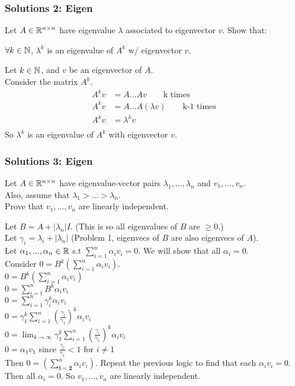 \documentclass[table]{beamer}
\newcommand\fontten{\fontsize{10}{1.2}\selectfont}
\renewenvironment{enumerate}%
{\begin{list}{\arabic{enumi}.}%
      {\setlength{\leftmargin}{2.5em}%
       \setlength{\itemsep}{-\parsep}%
       \setlength{\topsep}{-\parskip}%
       \usecounter{enumi}}%
 }{\end{list}}
\begin{document}
\begin{frame}
\frametitle{Solutions 2: Eigen}
Let $A \in \mathbb{R}^{n\times n}$ have eigenvalue $\lambda$ associated to eigenvector $v$.
Show that:
\begin{enumerate}
\item[2.] $\forall k \in \mathbb{N}$, $\lambda^k$ is an eigenvalue of $A^k$ w/ eigenvector $v$.
\begin{solution}
Let $k \in \mathbb{N}$, and $v$ be an eigenvector of $A$.\\
Consider the matrix $A^k$.\\
\begin{align*}
A^k v &= A... Av \qquad \text{k times} \\
A^k v &= A... A(\lambda v) \qquad \text{k-1 times} \\
A^k v &= \lambda^k v \\
\end{align*}
So $\lambda^k$ is an eigenvalue of $A^k$ with eigenvector $v$.
\end{solution}
\end{enumerate}
\end{frame}

\begin{frame}
\frametitle{Solutions 3: Eigen}

\begin{enumerate}

\item[3.] Let $A\in \mathbb{R}^{n \times n}$ have eigenvalue-vector pairs $\lambda_1,...,\lambda_n$ and $v_1,...,v_n$. \\
Also, assume that $\lambda_1>...>\lambda_n$.\\
Prove that $v_1,...,v_n$ are linearly independent.
\begin{solution}
\fontten
Let $B = A + |\lambda_n|I$. (This is so all eigenvalues of $B$ are $\geq 0$.) \\
Let $\gamma_i = \lambda_i+|\lambda_n|$
(Problem 1, eigenvecs of $B$ are also eigenvecs of $A$). \\
Let $\alpha_1,...,\alpha_n \in \mathbb{R}$ s.t $\sum_{i=1}^n \alpha_i v_i = 0$. We will show that all $\alpha_i=0$.\\
Consider $0 = B^k (\sum_{i=1}^n \alpha_i v_i)$. \\
\qquad $0 = B^k (\sum_{i=1}^n \alpha_i v_i)$ \\
\qquad $0 = \sum_{i=1}^n B^k \alpha_i v_i$ \\
\qquad $0 = \sum_{i=1}^n \gamma_i^k \alpha_i v_i$ \\ 
\qquad $0 = \gamma_1^k  \sum_{i=1}^n (\frac{\gamma_i}{\gamma_1})^k \alpha_i v_i$  \\ 
\qquad $0 = \lim_{k \rightarrow \infty} \gamma_1^k  \sum_{i=1}^n (\frac{\gamma_i}{\gamma_1})^k \alpha_i v_i$ \\
\qquad $0 = \alpha_1v_1$ \quad since $\frac{\gamma_i}{\gamma_1} < 1$ for $ i \neq 1$ \\
Then $0 = (\sum_{\mathbf{i=2}}^n \alpha_i v_i)$. Repeat the previous logic to find that each $\alpha_iv_i=0$. Then all $\alpha_i=0$. So $v_1,...,v_n$ are linearly independent. 
\end{solution}
\end{enumerate}
\end{frame}
\end{document}
